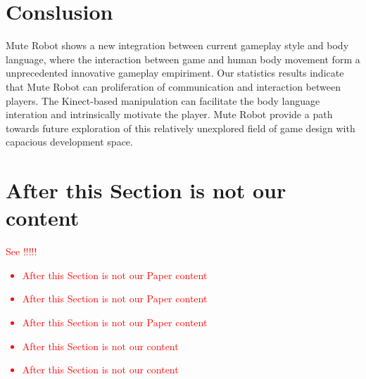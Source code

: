 \documentclass{chi-ext}
\begin{document}
\section{Conslusion}
Mute Robot shows a new integration between current gameplay style and body language, where the interaction between game and human body movement form a unprecedented innovative gameplay empiriment.
Our statistics results indicate that Mute Robot can proliferation of communication and interaction between players.
The Kinect-based manipulation can facilitate the body language interation and intrinsically motivate the player.
Mute Robot provide a path towards future exploration of this relatively unexplored field of game design with capacious development space.




\section{After this Section is not our content}
\textcolor{red}{
See !!!!!
\begin{itemize}\compresslist
\item   
After this Section is not our Paper content
\item   
After this Section is not our Paper content
\item   
After this Section is not our Paper content
\item   
After this Section is not our content
\item   
After this Section is not our content
\end{itemize}
}


\end{document}
